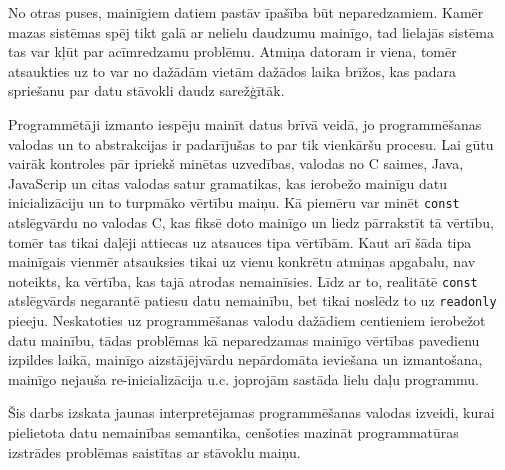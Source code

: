 \documentclass[12pt,a4paper]{report}
\begin{document}
No otras puses, mainīgiem datiem pastāv īpašība būt neparedzamiem. Kamēr mazas sistēmas spēj tikt galā ar nelielu daudzumu mainīgo, tad lielajās sistēma tas var kļūt par acīmredzamu problēmu. Atmiņa datoram ir viena, tomēr atsaukties uz to var no dažādām vietām dažādos laika brīžos, kas padara spriešanu par datu stāvokli daudz sarežģītāk.  


Programmētāji izmanto iespēju mainīt datus brīvā veidā, jo  programmēšanas valodas un to abstrakcijas ir padarījušas to par tik vienkāršu procesu. Lai gūtu vairāk kontroles pār ipriekš minētas uzvedības, valodas no C saimes, Java, JavaScrip un citas valodas satur gramatikas, kas ierobežo mainīgu datu inicializāciju un to turpmāko vērtību maiņu. Kā piemēru var minēt \texttt{const} atslēgvārdu no valodas C, kas fiksē doto mainīgo un liedz pārrakstīt tā vērtību, tomēr tas tikai daļēji attiecas uz atsauces tipa vērtībām. Kaut arī šāda tipa mainīgais vienmēr atsauksies tikai uz vienu konkrētu atmiņas apgabalu, nav noteikts, ka vērtība, kas tajā atrodas nemainīsies. Līdz ar to, realitātē \texttt{const} atslēgvārds negarantē patiesu datu nemainību, bet tikai noslēdz to uz \texttt{readonly} pieeju.
Neskatoties uz programmēšanas valodu dažādiem centieniem ierobežot datu mainību, tādas problēmas kā neparedzamas mainīgo vērtības pavedienu izpildes laikā, mainīgo aizstājējvārdu nepārdomāta ieviešana un izmantošana, mainīgo nejauša re-inicializācija u.c. joprojām sastāda lielu daļu programmu.\cite{immutability}

Šis darbs izskata jaunas interpretējamas programmēšanas valodas izveidi, kurai pielietota datu nemainības semantika, cenšoties mazināt programmatūras izstrādes problēmas saistītas ar stāvoklu maiņu.

 
   
\end{document}
